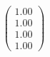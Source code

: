 \documentclass[preview]{standalone}
\begin{document}
\begin{align*}
\begin{pmatrix} 1.00 \\ 1.00 \\ 1.00 \\ 1.00 \end{pmatrix}
\end{align*}
\end{document}
